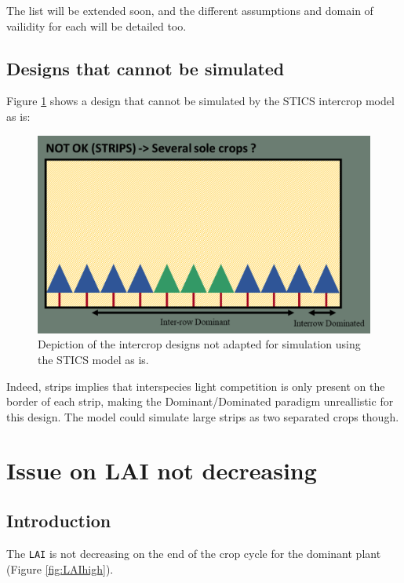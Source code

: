 \documentclass[
]{book}
\begin{document}
The list will be extended soon, and the different assumptions and domain of vailidity for each will be detailed too.

\hypertarget{designs-that-cannot-be-simulated}{%
\section{Designs that cannot be simulated}\label{designs-that-cannot-be-simulated}}

Figure \ref{fig:DesignKO} shows a design that cannot be simulated by the STICS intercrop model as is:

\begin{figure}
\centering
\includegraphics{img/Design_KO.png}
\caption{\label{fig:DesignKO}Depiction of the intercrop designs not adapted for simulation using the STICS model as is.}
\end{figure}

Indeed, strips implies that interspecies light competition is only present on the border of each strip, making the Dominant/Dominated paradigm unreallistic for this design. The model could simulate large strips as two separated crops though.

\hypertarget{LAIissue}{%
\chapter{Issue on LAI not decreasing}\label{LAIissue}}

\hypertarget{introduction-5}{%
\section{Introduction}\label{introduction-5}}

The \texttt{LAI} is not decreasing on the end of the crop cycle for the dominant plant (Figure \ref{fig:LAIhigh}).
\end{document}
